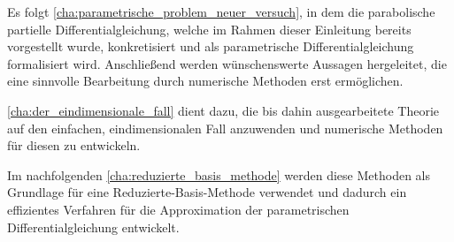 Es folgt \autoref{cha:parametrische_problem_neuer_versuch}, in dem die parabolische partielle Differentialgleichung, welche im Rahmen dieser Einleitung bereits vorgestellt wurde, konkretisiert und als parametrische Differentialgleichung formalisiert wird.
Anschließend werden wünschenswerte Aussagen hergeleitet, die eine sinnvolle Bearbeitung durch numerische Methoden erst ermöglichen.

\autoref{cha:der_eindimensionale_fall} dient dazu, die bis dahin ausgearbeitete Theorie auf den einfachen, eindimensionalen Fall anzuwenden und numerische Methoden für diesen zu entwickeln.

Im nachfolgenden \autoref{cha:reduzierte_basis_methode} werden diese Methoden als Grundlage für eine Reduzierte-Basis-Methode verwendet und dadurch ein effizientes Verfahren für die Approximation der parametrischen Differentialgleichung entwickelt.


